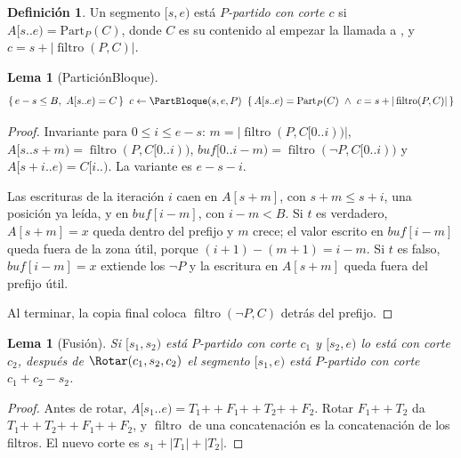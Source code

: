 \documentclass[10pt,a4paper]{article}
\theoremstyle{plain}
\newtheorem{lema}[teorema]{Lema}
\theoremstyle{definition}
\newtheorem{definicion}[teorema]{Definición}
\theoremstyle{remark}
\newcommand{\cat}{\mathbin{+\!\!+}}
\newcommand{\buf}{\mathit{buf}}
\newcommand{\Bsz}{B}
\newcommand{\filt}{\operatorname{filtro}}
\newcommand{\hoare}[3]{\{\,#1\,\}\;\;#2\;\;\{\,#3\,\}}
\begin{document}
\begin{definicion}
Un segmento $[s,e)$ está \emph{$P$-partido con corte $c$} si
$A[s..e)=\mathrm{Part}_P(C)$, donde $C$ es su contenido al empezar la llamada a
\Part, y $c=s+|\filt(P,C)|$.
\end{definicion}

\begin{lema}[ParticiónBloque]\label{lem:partbloque}
\[
\hoare{e-s\le\Bsz,\ A[s..e)=C}{c\gets\PartBloque(s,e,P)}{A[s..e)=\mathrm{Part}_P(C)\ \wedge\ c=s+|\filt(P,C)|}
\]
\end{lema}
\begin{proof}
Invariante para $0\le i\le e-s$: $m=|\filt(P,C[0..i))|$,
$A[s..s{+}m)=\filt(P,C[0..i))$, $\buf[0..i{-}m)=\filt(\neg P,C[0..i))$ y
$A[s{+}i..e)=C[i..)$. La variante es $e-s-i$.

Las escrituras de la iteración $i$ caen en $A[s+m]$, con $s+m\le s+i$, una posición ya
leída, y en $\buf[i-m]$, con $i-m<\Bsz$. Si $t$ es verdadero, $A[s+m]=x$ queda dentro
del prefijo y $m$ crece; el valor escrito en $\buf[i-m]$ queda fuera de la zona útil,
porque $(i{+}1)-(m{+}1)=i-m$. Si $t$ es falso, $\buf[i-m]=x$ extiende los $\neg P$ y
la escritura en $A[s+m]$ queda fuera del prefijo útil.

Al terminar, la copia final coloca $\filt(\neg P,C)$ detrás del prefijo.
\end{proof}

\begin{lema}[Fusión]\label{lem:fusion}
Si $[s_1,s_2)$ está $P$-partido con corte $c_1$ y $[s_2,e)$ lo está con corte $c_2$,
después de $\Rotar(c_1,s_2,c_2)$ el segmento $[s_1,e)$ está $P$-partido con corte
$c_1+c_2-s_2$.
\end{lema}
\begin{proof}
Antes de rotar, $A[s_1..e)=T_1\cat F_1\cat T_2\cat F_2$. Rotar $F_1\cat T_2$ da
$T_1\cat T_2\cat F_1\cat F_2$, y $\filt$ de una concatenación es la concatenación de
los filtros. El nuevo corte es $s_1+|T_1|+|T_2|$.
\end{proof}
\end{document}
